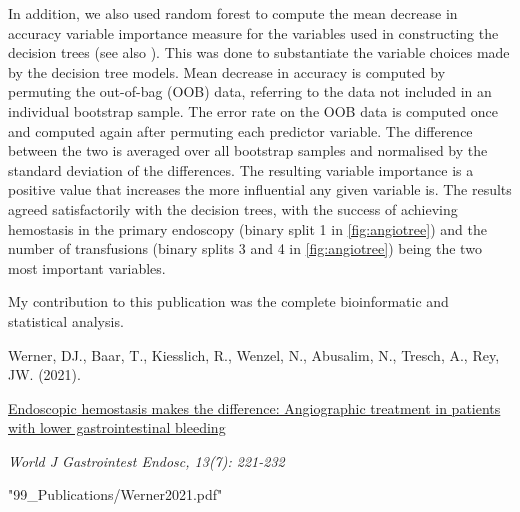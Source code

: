 \noindent
In addition, we also used random forest to compute the mean decrease in
accuracy variable importance measure for the variables used in constructing
the decision trees \citep{Han2016} (see also ). This
was done to substantiate the variable choices made by the decision tree
models. Mean decrease in accuracy is computed by permuting the out-of-bag (OOB)
data, referring to the data not included in an individual bootstrap sample.
The error rate on the OOB data is computed once and computed again after
permuting each predictor variable.  The difference between the two is averaged
over all bootstrap samples and normalised by the standard deviation of the
differences. The resulting variable importance is a positive value that
increases the more influential any given variable is. The results agreed
satisfactorily with the decision trees, with the success of achieving
hemostasis in the primary endoscopy (binary split 1 in \cref{fig:angiotree})
and the number of transfusions (binary splits 3 and 4 in \cref{fig:angiotree})
being the two most important variables.

\vfill
\noindent My contribution to this publication was the complete bioinformatic
and statistical analysis.\nopagebreak
\medskip
\begin{tcolorbox}[
  boxrule=0pt, leftrule=1pt, colframe=s-blue, colback=white, sharp corners=all]%
  \raggedright
  Werner, DJ., Baar, T., Kiesslich, R., Wenzel, N., Abusalim, N., Tresch, A.,
  Rey, JW. (2021).
  
  \smallskip
  \href{https://www.wjgnet.com/1948-5190/full/v13/i7/221.htm}
    {Endoscopic hemostasis makes the difference: Angiographic treatment in
    patients with lower gastrointestinal bleeding}

  \smallskip
  \textit{World J Gastrointest Endosc, 13(7): 221-232}
\end{tcolorbox}



  {"99_Publications/Werner2021.pdf"}

\null
\thispagestyle{empty}
\newpage